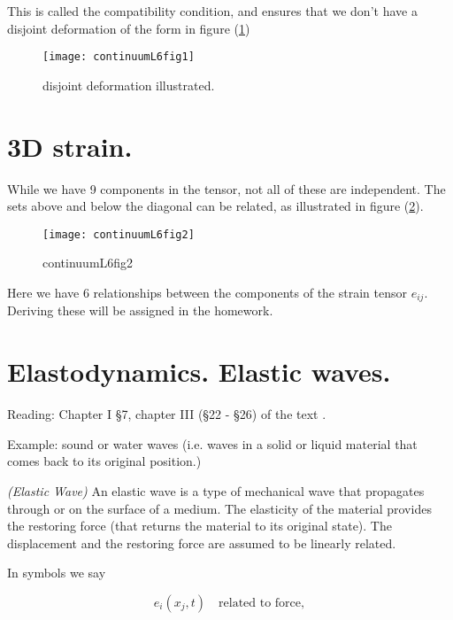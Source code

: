 This is called the compatibility condition, and ensures that we don't have a disjoint deformation of the form in figure (\ref{fig:continuumL6:continuumL6fig1})

\begin{figure}[htp]
   \centering
   \texttt{[image: continuumL6fig1]}
   \caption{disjoint deformation illustrated.}\label{fig:continuumL6:continuumL6fig1}
\end{figure}

\section{3D strain.}

While we have 9 components in the tensor, not all of these are independent.  The sets above and below the diagonal can be related, as illustrated in figure (\ref{fig:continuumL6:continuumL6fig2}).

\begin{figure}[htp]
   \centering
   \texttt{[image: continuumL6fig2]}
   \caption{continuumL6fig2}\label{fig:continuumL6:continuumL6fig2}
\end{figure}

Here we have 6 relationships between the components of the strain tensor $e_{ij}$.  Deriving these will be assigned in the homework.

\section{Elastodynamics.  Elastic waves.}

Reading: Chapter I \S 7, chapter III (\S 22 - \S 26) of the text \cite{landau1960theory}.

Example: sound or water waves (i.e. waves in a solid or liquid material that comes back to its original position.)

\begin{definition}
\emph{(Elastic Wave)}
\label{dfn:continuumL6:10}
An elastic wave is a type of mechanical wave that propagates through or on the surface of a medium.  The elasticity of the material provides the restoring force (that returns the material to its original state).  The displacement and the restoring force are assumed to be linearly related.
\end{definition}

In symbols we say

\begin{equation}\label{eqn:continuumL6:130}
e_i(x_j, t) \quad \mbox{related to force},
\end{equation}

